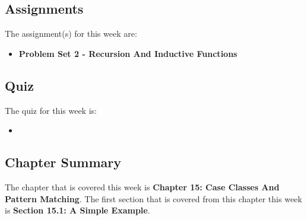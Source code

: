 \subsection{Assignments}

The assignment(s) for this week are:

\begin{itemize}
    \item \textbf{Problem Set 2 - Recursion And Inductive Functions}
\end{itemize}

\subsection{Quiz}

The quiz for this week is:

\begin{itemize}
    \item {}
\end{itemize}

\subsection{Chapter Summary}

The chapter that is covered this week is \textbf{Chapter 15: Case Classes And Pattern Matching}. The first section that is covered from this chapter this week is \textbf{Section 15.1: A Simple Example}.

